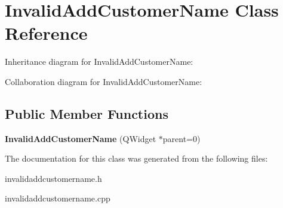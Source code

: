 \section{Invalid\+Add\+Customer\+Name Class Reference}
\label{class_invalid_add_customer_name}


Inheritance diagram for Invalid\+Add\+Customer\+Name\+:


Collaboration diagram for Invalid\+Add\+Customer\+Name\+:
\subsection*{Public Member Functions}
\begin{DoxyCompactItemize}
\item 
\mbox{\label{class_invalid_add_customer_name_a899165ca7d56ac85652302e82a169547}} 
{\bfseries Invalid\+Add\+Customer\+Name} (Q\+Widget $\ast$parent=0)
\end{DoxyCompactItemize}


The documentation for this class was generated from the following files\+:\begin{DoxyCompactItemize}
\item 
invalidaddcustomername.\+h\item 
invalidaddcustomername.\+cpp\end{DoxyCompactItemize}
